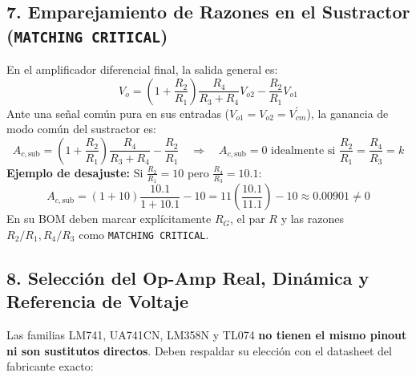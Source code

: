 \documentclass[10pt, a4paper]{article}
\begin{document}
\subsection*{7. Emparejamiento de Razones en el Sustractor (\texttt{MATCHING CRITICAL})}
En el amplificador diferencial final, la salida general es:
\begin{equation}
    V_o = \left(1 + \frac{R_2}{R_1}\right)\frac{R_4}{R_3 + R_4}V_{o2} - \frac{R_2}{R_1}V_{o1}
\end{equation}
Ante una señal común pura en sus entradas ($V_{o1} = V_{o2} = V_{cm}^\prime$), la ganancia de modo común del sustractor es:
\begin{equation}
    A_{c,\mathrm{sub}} = \left(1 + \frac{R_2}{R_1}\right)\frac{R_4}{R_3 + R_4} - \frac{R_2}{R_1} \quad \Longrightarrow \quad A_{c,\mathrm{sub}} = 0 \text{ idealmente si } \boxed{\frac{R_2}{R_1} = \frac{R_4}{R_3} = k}
\end{equation}
\textbf{Ejemplo de desajuste:} Si $\frac{R_2}{R_1} = 10$ pero $\frac{R_4}{R_3} = 10.1$:
\begin{equation*}
    A_{c,\mathrm{sub}} = (1 + 10)\frac{10.1}{1 + 10.1} - 10 = 11\left(\frac{10.1}{11.1}\right) - 10 \approx 0.00901 \neq 0
\end{equation*}
En su BOM deben marcar explícitamente $R_G$, el par $R$ y las razones $R_2/R_1, R_4/R_3$ como \texttt{MATCHING CRITICAL}.

\subsection*{8. Selección del Op-Amp Real, Dinámica y Referencia de Voltaje}
Las familias LM741, UA741CN, LM358N y TL074 \textbf{no tienen el mismo pinout ni son sustitutos directos}. Deben respaldar su elección con el datasheet del fabricante exacto:
\end{document}
